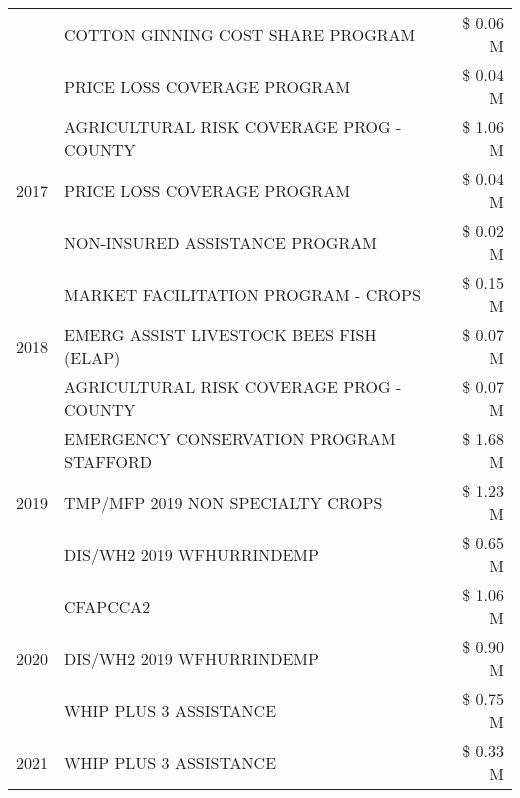 \begin{tabular}{llr}
 & COTTON GINNING COST SHARE PROGRAM & \$ 0.06 M \\
 & PRICE LOSS COVERAGE PROGRAM & \$ 0.04 M \\
\cline{1-3}
\multirow[t]{3}{*}{2017} & AGRICULTURAL RISK COVERAGE PROG - COUNTY & \$ 1.06 M \\
 & PRICE LOSS COVERAGE PROGRAM & \$ 0.04 M \\
 & NON-INSURED ASSISTANCE PROGRAM & \$ 0.02 M \\
\cline{1-3}
\multirow[t]{3}{*}{2018} & MARKET FACILITATION PROGRAM - CROPS & \$ 0.15 M \\
 & EMERG ASSIST LIVESTOCK BEES FISH (ELAP) & \$ 0.07 M \\
 & AGRICULTURAL RISK COVERAGE PROG - COUNTY & \$ 0.07 M \\
\cline{1-3}
\multirow[t]{3}{*}{2019} & EMERGENCY CONSERVATION PROGRAM STAFFORD & \$ 1.68 M \\
 & TMP/MFP 2019 NON SPECIALTY CROPS & \$ 1.23 M \\
 & DIS/WH2 2019 WFHURRINDEMP & \$ 0.65 M \\
\cline{1-3}
\multirow[t]{3}{*}{2020} & CFAPCCA2 & \$ 1.06 M \\
 & DIS/WH2 2019 WFHURRINDEMP & \$ 0.90 M \\
 & WHIP PLUS 3 ASSISTANCE & \$ 0.75 M \\
\cline{1-3}
2021 & WHIP PLUS 3 ASSISTANCE & \$ 0.33 M \\
\cline{1-3}
\bottomrule
\end{tabular}
